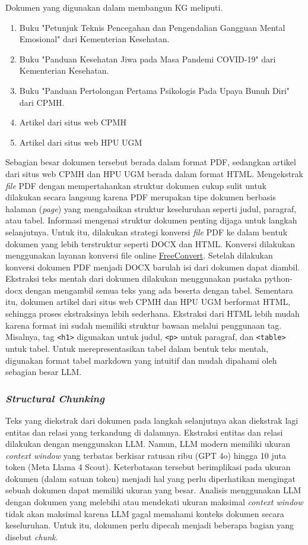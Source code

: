 Dokumen yang digunakan dalam membangun KG meliputi.
\begin{enumerate}
	\item Buku "Petunjuk Teknis Pencegahan dan Pengendalian Gangguan Mental Emosional" dari Kementerian Kesehatan.
	\item Buku "Panduan Kesehatan Jiwa pada Masa Pandemi COVID-19" dari Kementerian Kesehatan.
	\item Buku "Panduan Pertolongan Pertama Psikologis Pada Upaya Bunuh Diri" dari CPMH.
	\item Artikel dari situs web CPMH
	\item Artikel dari situs web HPU UGM
\end{enumerate}

Sebagian besar dokumen tersebut berada dalam format PDF, sedangkan artikel dari situs web CPMH dan HPU UGM berada dalam format HTML.
Mengekstrak \textit{file} PDF dengan mempertahankan struktur dokumen cukup sulit untuk dilakukan secara langsung karena PDF merupakan tipe dokumen berbasis halaman (\textit{page}) yang mengabaikan struktur keseluruhan seperti judul, paragraf, atau tabel.
Informasi mengenai struktur dokumen penting dijaga untuk langkah selanjutnya.
Untuk itu, dilakukan strategi konversi \textit{file} PDF ke dalam bentuk dokumen yang lebih terstruktur seperti DOCX dan HTML.
Konversi dilakukan menggunakan layanan konversi file online \href{https://www.freeconvert.com/}{FreeConvert}.
Setelah dilakukan konversi dokumen PDF menjadi DOCX barulah isi dari dokumen dapat diambil.
Ekstraksi teks mentah dari dokumen dilakukan menggunakan pustaka python-docx dengan mengambil semua teks yang ada beserta dengan tabel.
Sementara itu, dokumen artikel dari situs web CPMH dan HPU UGM berformat HTML, sehingga proses ekstraksinya lebih sederhana.
Ekstraksi dari HTML lebih mudah karena format ini sudah memiliki struktur bawaan melalui penggunaan tag.
Misalnya, tag \texttt{<h1>} digunakan untuk judul, \texttt{<p>} untuk paragraf, dan \texttt{<table>} untuk tabel.
Untuk merepresentasikan tabel dalam bentuk teks mentah, digunakan format tabel markdown yang intuitif dan mudah dipahami oleh sebagian besar LLM.

\subsubsection{\textit{Structural Chunking}}
Teks yang diekstrak dari dokumen pada langkah selanjutnya akan diekstrak lagi entitas dan relasi yang terkandung di dalamnya.
Ekstraksi entitas dan relasi dilakukan dengan menggunakan LLM.
Namun, LLM modern memiliki ukuran \textit{context window} yang terbatas berkisar ratusan ribu (GPT 4o) hingga 10 juta token (Meta Llama 4 Scout).
Keterbatasan tersebut berimplikasi pada ukuran dokumen (dalam satuan token) menjadi hal yang perlu diperhatikan mengingat sebuah dokumen dapat memiliki ukuran yang besar.
Analisis menggunakan LLM dengan dokumen yang melebihi atau mendekati ukuran maksimal \textit{context window} tidak akan maksimal karena LLM gagal memahami konteks dokumen secara keseluruhan.
Untuk itu, dokumen perlu dipecah menjadi beberapa bagian yang disebut \textit{chunk}.

